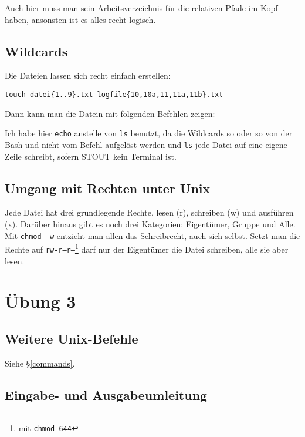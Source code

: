 \documentclass[12pt]{article}
\begin{document}
Auch hier muss man sein Arbeitsverzeichnis für die relativen Pfade im Kopf haben, ansonsten ist es alles recht logisch.

\subsection{Wildcards}

Die Dateien lassen sich recht einfach erstellen:
\begin{lstlisting}[caption=Anlegen der Dateien]
touch datei{1..9}.txt logfile{10,10a,11,11a,11b}.txt
\end{lstlisting}

Dann kann man die Datein mit folgenden Befehlen zeigen:



Ich habe hier \texttt{echo} anstelle von \texttt{ls} benutzt, da die Wildcards so oder so von der Bash und nicht vom Befehl aufgelöst werden und \texttt{ls} jede Datei auf eine eigene Zeile schreibt, sofern STOUT kein Terminal ist.

\subsection{Umgang mit Rechten unter Unix}

Jede Datei hat drei grundlegende Rechte, lesen (r), schreiben (w) und ausführen (x). Darüber hinaus gibt es noch drei Kategorien: Eigentümer, Gruppe und Alle. Mit \texttt{chmod -w} entzieht man allen das Schreibrecht, auch sich selbst. Setzt man die Rechte auf \texttt{rw-r--r--}\footnote{mit \texttt{chmod 644}} darf nur der Eigentümer die Datei schreiben, alle sie aber lesen.

\section{Übung 3}

\subsection{Weitere Unix-Befehle}

Siehe §\ref{commands}.

\subsection{Eingabe- und Ausgabeumleitung}
\end{document}
